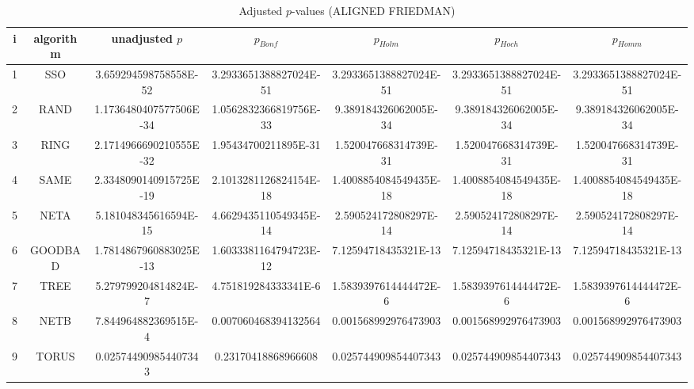 \documentclass[a4paper,10pt]{article}
\begin{document}
\begin{landscape}
\begin{table}[!htp]
\centering\scriptsize
\caption{Adjusted $p$-values (ALIGNED FRIEDMAN)}
\begin{tabular}{ccccccc}
i&algorithm&unadjusted $p$&$p_{Bonf}$&$p_{Holm}$&$p_{Hoch}$&$p_{Homm}$\\
\hline
1& SSO&3.659294598758558E-52&3.2933651388827024E-51&3.2933651388827024E-51&3.2933651388827024E-51&3.2933651388827024E-51\\
2& RAND&1.1736480407577506E-34&1.0562832366819756E-33&9.389184326062005E-34&9.389184326062005E-34&9.389184326062005E-34\\
3& RING&2.1714966690210555E-32&1.95434700211895E-31&1.520047668314739E-31&1.520047668314739E-31&1.520047668314739E-31\\
4& SAME&2.3348090140915725E-19&2.1013281126824154E-18&1.4008854084549435E-18&1.4008854084549435E-18&1.4008854084549435E-18\\
5& NETA&5.181048345616594E-15&4.6629435110549345E-14&2.590524172808297E-14&2.590524172808297E-14&2.590524172808297E-14\\
6& GOODBAD&1.7814867960883025E-13&1.6033381164794723E-12&7.12594718435321E-13&7.12594718435321E-13&7.12594718435321E-13\\
7& TREE&5.279799204814824E-7&4.751819284333341E-6&1.5839397614444472E-6&1.5839397614444472E-6&1.5839397614444472E-6\\
8& NETB&7.844964882369515E-4&0.007060468394132564&0.001568992976473903&0.001568992976473903&0.001568992976473903\\
9& TORUS&0.025744909854407343&0.23170418868966608&0.025744909854407343&0.025744909854407343&0.025744909854407343\\
\hline
\end{tabular}
\end{table}


\end{landscape}
\end{document}
